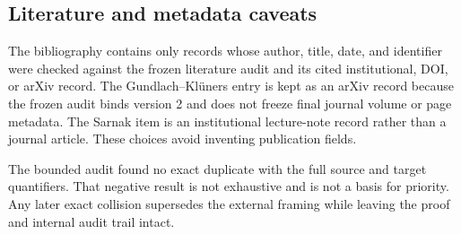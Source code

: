 \subsection{Literature and metadata caveats}

The bibliography contains only records whose author, title, date, and
identifier were checked against the frozen literature audit and its cited
institutional, DOI, or arXiv record.  The Gundlach--Kl\"uners entry is kept as
an arXiv record because the frozen audit binds version 2 and does not freeze
final journal volume or page metadata.  The Sarnak item is an institutional
lecture-note record rather than a journal article.  These choices avoid
inventing publication fields.

The bounded audit found no exact duplicate with the full source and target
quantifiers.  That negative result is not exhaustive and is not a basis for
priority.  Any later exact collision supersedes the external framing while
leaving the proof and internal audit trail intact.
